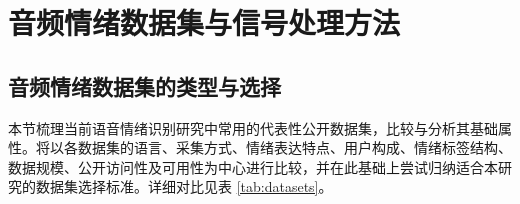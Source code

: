 %
%
%
%
%
\chapter{音频情绪数据集与信号处理方法}

\section{音频情绪数据集的类型与选择}

本节梳理当前语音情绪识别研究中常用的代表性公开数据集，比较与分析其基础属性。将以各数据集的语言、采集方式、情绪表达特点、用户构成、情绪标签结构、数据规模、公开访问性及可用性为中心进行比较，并在此基础上尝试归纳适合本研究的数据集选择标准。详细对比见表 \ref{tab:datasets}。

